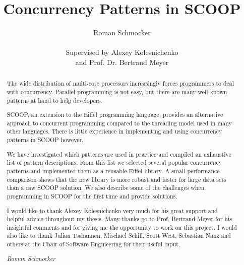 \documentclass[a4paper,10pt,titlepage]{article}
\title{Concurrency Patterns in SCOOP}
\author{Roman Schmocker \\ \\ Supervised by Alexey Kolesnichenko \\ and Prof. Dr. Bertrand Meyer}
\begin{document}

\maketitle
\thispagestyle{empty}
\newpage



\begin{abstract}
\thispagestyle{plain}
\setcounter{page}{2}
The wide distribution of multi-core processors increasingly forces programmers to deal with concurrency.
Parallel programming is not easy, but there are many well-known patterns at hand to help developers.

SCOOP, an extension to the Eiffel programming language, provides an alternative approach to concurrent programming compared to the threading mo\-del used in many other languages.
There is little experience in implementing and using concurrency patterns in SCOOP however.

We have investigated which patterns are used in practice and compiled an exhaustive list of pattern descriptions.
From this list we selected several popular concurrency patterns and implemented them as a reusable Eiffel library.
A small performance comparison shows that the new library is more robust and faster for large data sets than a raw SCOOP solution.
We also describe some of the challenges when programming in SCOOP for the first time and provide solutions.
\end{abstract}

\renewcommand{\abstractname}{Acknowledgements}
\begin{abstract}
\thispagestyle{plain}
\setcounter{page}{3}
I would like to thank Alexey Kolesnichenko very much for his great support and helpful advice throughout my thesis.
Many thanks go to Prof. Bertrand Meyer for his insightful comments and for giving me the opportunity to work on this project.
I would also like to thank Julian Tschannen, Mischael Schill, Scott West, Sebastian Nanz and others at the Chair of Software Engineering for their useful input.

\emph{Roman Schmocker}
\end{abstract}


\setcounter{page}{4}
\tableofcontents
\end{document}
